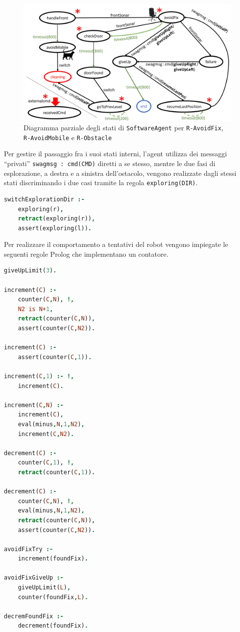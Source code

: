 \documentclass{../llncs}
\newcommand{\codescript}[1]{{\mbox{\small{\texttt{#1}}}}\xspace}
\newcommand{\code}[1]{{\color{blue}\small{\texttt{#1}}}}
\newcommand{\labelfig}[1]{\label{fig:#1}}
\begin{document}
\begin{figure}[!htb]
\centering
\includegraphics[scale=0.4]{img/stateDiagramObstacle.png}
\caption{Diagramma parziale degli stati di \texttt{SoftwareAgent} per \code{R-AvoidFix}, \code{R-AvoidMobile} e \code{R-Obstacle}}\labelfig{obstacleAvoidance}
\end{figure}

Per gestire il passaggio fra i suoi stati interni, l'agent utilizza dei messaggi ``privati'' \codescript{swagmsg : cmd(CMD)} diretti a se stesso, mentre le due fasi di esplorazione, a destra e a sinistra dell'ostacolo, vengono realizzate dagli stessi stati discriminando i due casi tramite la regola \codescript{exploring(DIR)}.\\

\begin{lstlisting}[language=Prolog, keywordstyle=\color{black}, caption={SoftwareAgent, Rules - pt2}]
switchExplorationDir :-
	exploring(r),
	retract(exploring(r)),
	assert(exploring(l)).
\end{lstlisting}

Per realizzare il comportamento a tentativi del robot vengono impiegate le seguenti regole Prolog che implementano un contatore.\\

\begin{lstlisting}[language=Prolog, keywordstyle=\color{black}, caption={SoftwareAgent, Rules - pt3}]
giveUpLimit(3).

increment(C) :-
	counter(C,N), !,
	N2 is N+1,
	retract(counter(C,N)),
	assert(counter(C,N2)).
	
increment(C) :-
	assert(counter(C,1)).
	
increment(C,1) :- !,
	increment(C).
	
increment(C,N) :-
	increment(C),
	eval(minus,N,1,N2),
	increment(C,N2).

decrement(C) :-
	counter(C,1), !,
	retract(counter(C,1)).

decrement(C) :-
	counter(C,N), !,
	eval(minus,N,1,N2),
	retract(counter(C,N)),
	assert(counter(C,N2)).

avoidFixTry :-
	increment(foundFix).

avoidFixGiveUp :-
	giveUpLimit(L),
	counter(foundFix,L).

decremFoundFix :-
	decrement(foundFix).
\end{lstlisting}
\end{document}
